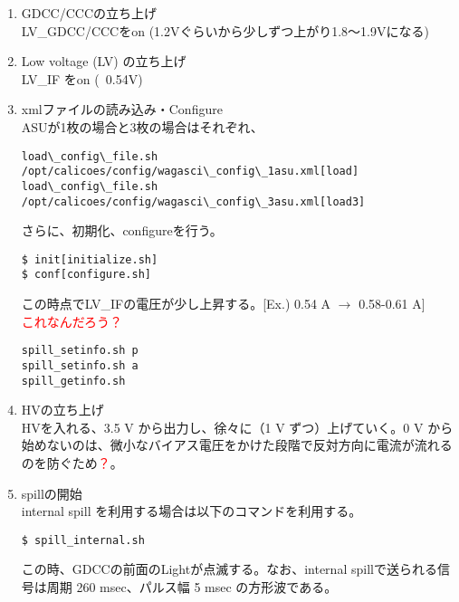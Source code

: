 \begin{enumerate}
\item GDCC/CCCの立ち上げ\\
LV\_GDCC/CCCをon (1.2Vぐらいから少しずつ上がり1.8〜1.9Vになる)

\item Low voltage (LV) の立ち上げ\\
LV\_IF をon (~0.54V)

\item xmlファイルの読み込み・Configure\\
ASUが1枚の場合と3枚の場合はそれぞれ、
\begin{screen}
\begin{verbatim}
load\_config\_file.sh /opt/calicoes/config/wagasci\_config\_1asu.xml[load]
load\_config\_file.sh /opt/calicoes/config/wagasci\_config\_3asu.xml[load3]
\end{verbatim}
\end{screen}
さらに、初期化、configureを行う。
\begin{screen}
\begin{verbatim}
$ init[initialize.sh]
$ conf[configure.sh]
\end{verbatim}
\end{screen}
この時点でLV\_IFの電圧が少し上昇する。[Ex.) 0.54 A $\to$ 0.58-0.61 A]\\

\textcolor{red}{これなんだろう？}
\begin{screen}
\begin{verbatim}
spill_setinfo.sh p 
spill_setinfo.sh a
spill_getinfo.sh
\end{verbatim}
\end{screen}

\item HVの立ち上げ\\
HVを入れる、3.5 V から出力し、徐々に（1 V ずつ）上げていく。0 V から始めないのは、微小なバイアス電圧をかけた段階で反対方向に電流が流れるのを防ぐため\textcolor{red}{？}。

\item spillの開始\\
internal spill を利用する場合は以下のコマンドを利用する。
\begin{screen}
\begin{verbatim}
$ spill_internal.sh
\end{verbatim}
\end{screen}
この時、GDCCの前面のLightが点滅する。なお、internal spillで送られる信号は周期 260 msec、パルス幅 5 msec の方形波である。\\


\end{enumerate}
